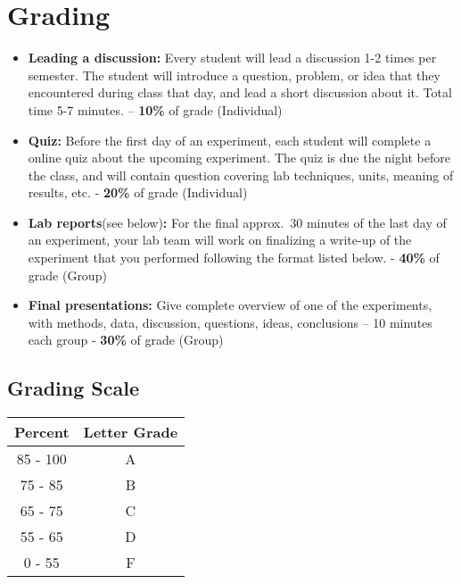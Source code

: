 \section*{Grading}
\begin{itemize}
\itemsep0em
\item \textbf{Leading a discussion:} Every student will lead a discussion 1-2 times per semester. The student will introduce a question, problem, or idea that they encountered during class that day, and lead a short discussion about it. Total time 5-7 minutes. \newline – \textbf{10\%} of grade (Individual)
\item \textbf{Quiz:}  Before the first day of an experiment, each student will complete a online quiz about the upcoming experiment. The quiz is due the night before the class, and will contain question covering lab techniques, units, meaning of results, etc. \newline - \textbf{20\%} of grade (Individual)
\item \textbf{Lab reports}(see below)\textbf{:} For the final approx.\ 30 minutes of the last day of an experiment, your lab team will work on finalizing a write-up of the experiment that you performed following the format listed below. \newline - \textbf{40\%} of grade (Group)
\item \textbf{Final presentations:} Give complete overview of one of the experiments, with methods, data, discussion, questions, ideas, conclusions – 10 minutes each group \newline - \textbf{30\%} of grade (Group)
\end{itemize}

\subsection*{Grading Scale}
\begin{table}[ht]
\centering
\begin{tabular}{|c|c|}
\hline 
\rule[-1ex]{0pt}{2.5ex} Percent & Letter Grade \\ 
\hline 
\rule[-1ex]{0pt}{2.5ex} 85 - 100 & A \\ 
\hline 
\rule[-1ex]{0pt}{2.5ex} 75 - 85 & B \\ 
\hline 
\rule[-1ex]{0pt}{2.5ex} 65 - 75 & C \\ 
\hline 
\rule[-1ex]{0pt}{2.5ex} 55 - 65 & D \\ 
\hline 
\rule[-1ex]{0pt}{2.5ex} 0 - 55 & F \\ 
\hline 
\end{tabular}
\end{table}

